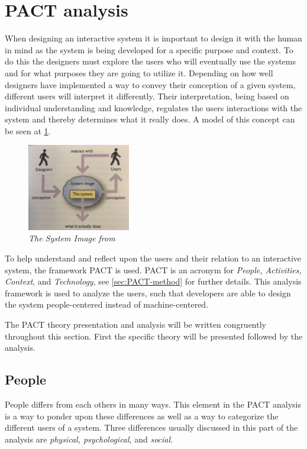 \section{PACT analysis}\label{sec:PACT}
When designing an interactive system it is important to design it with the human in mind as the system is being developed for a specific purpose and context.
To do this the designers must explore the users who will eventually use the systems and for what purposes they are going to utilize it. 
Depending on how well designers have implemented a way to convey their conception of a given system, different users will interpret it differently. 
Their interpretation, being based on individual understanding and knowledge, regulates the users interactions with the system and thereby determines what it really does. 
\citep{Benyon}
A model of this concept can be seen at \cref{fig:PACT-SystemImage}.

\begin{figure}[H]
	\centering
	\includegraphics[width=0.4\textwidth]{billeder/SystemImage-Benyon.png}
	\caption{\textit{The System Image from \citep[p.~31]{Benyon}}}
	\label{fig:PACT-SystemImage}
\end{figure}

To help understand and reflect upon the users and their relation to an interactive system, the framework PACT is used. 
PACT is an acronym for \textit{People, Activities, Context}, and \textit{Technology}, see \cref{sec:PACT-method} for further details.
This analysis framework is used to analyze the users, such that developers are able to design the system people-centered instead of machine-centered.
\citep{Benyon}

The PACT theory presentation and analysis will be written congruently throughout this section. First the specific theory will be presented followed by the analysis.

\subsection{People}\label{PACT-people}
People differs from each others in many ways.
This element in the PACT analysis is a way to ponder upon these differences as well as a way to categorize the different users of a system. 
Three differences usually discussed in this part of the analysis are \textit{physical, psychological}, and \textit{social}. \citep{Benyon}

